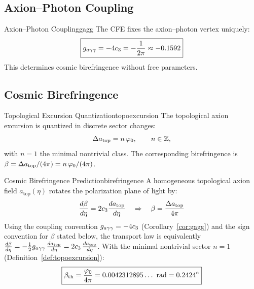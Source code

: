 \subsection{Axion--Photon Coupling}

\begin{corollary}{Axion--Photon Coupling}{gagg}
The CFE fixes the axion--photon vertex uniquely:
\begin{equation}
    \boxed{g_{a\gamma\gamma} = -4c_3 = -\frac{1}{2\pi} \approx -0.1592}
\end{equation}
This determines cosmic birefringence without free parameters.
\end{corollary}

\subsection{Cosmic Birefringence}

\begin{definition}{Topological Excursion Quantization}{topoexcursion}
The topological axion excursion is quantized in discrete sector changes:
\begin{equation}
    \Delta a_{\text{top}} = n\,\varphi_0, \qquad n\in\mathbb{Z},
\end{equation}
with $n=1$ the minimal nontrivial class. The corresponding birefringence is
$\beta = \Delta a_{\text{top}}/(4\pi) = n\,\varphi_0/(4\pi)$.
\end{definition}

\begin{theorem}{Cosmic Birefringence Prediction}{birefringence}
A homogeneous topological axion field $a_{\text{top}}(\eta)$ rotates the polarization plane of light by:
\begin{equation}
    \frac{d\beta}{d\eta} = 2c_3\frac{da_{\text{top}}}{d\eta} 
    \quad\Rightarrow\quad 
    \beta = \frac{\Delta a_{\text{top}}}{4\pi}
\end{equation}
Using the coupling convention $g_{a\gamma\gamma}=-4c_3$ (Corollary~\ref{cor:gagg}) and the sign convention for $\beta$ stated below, the transport law is equivalently
$\frac{d\beta}{d\eta} = -\frac{1}{2}g_{a\gamma\gamma}\,\frac{da_{\text{top}}}{d\eta} = 2c_3\,\frac{da_{\text{top}}}{d\eta}$.
With the minimal nontrivial sector $n=1$ (Definition~\ref{def:topoexcursion}):
\begin{equation}
    \boxed{\beta_{\text{th}} = \frac{\varphi_0}{4\pi} = 0.0042312895\ldots~\text{rad} = 0.2424^\circ}
\end{equation}
\end{theorem}

